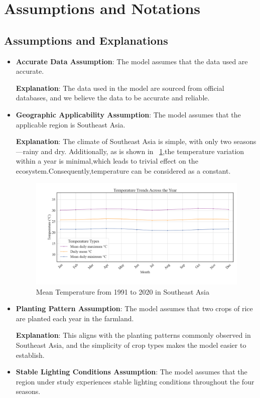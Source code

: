 \documentclass{HZNUMCM}
\begin{document}
  \section{Assumptions and Notations}
    \subsection{Assumptions and Explanations}
      \begin{itemize}
        \item \textbf{Accurate Data Assumption}: The model assumes that the data used are accurate.

        \textbf{Explanation}: The data used in the model are sourced from official databases, and we believe the data to be accurate and reliable.
        \item \textbf{Geographic Applicability Assumption}: The model assumes that the applicable region is Southeast Asia.

        \textbf{Explanation}: The climate of Southeast Asia is simple, with only two seasons—rainy and dry. Additionally, as is shown in \figurename~\ref{fig:Temperature},the temperature variation within a year is minimal,which leads to trivial effect on the ecosystem.Consequently,temperature can be considered as a constant.
        \begin{figure}[H]
          \centering
          \includegraphics[width=\linewidth]{images/AverTemper.png}
          \caption{Mean Temperature from 1991 to 2020 in Southeast Asia}
          \label{fig:Temperature}
        \end{figure}
        \item \textbf{Planting Pattern Assumption}: The model assumes that two crops of rice are planted each year in the farmland.
  
        \textbf{Explanation}: This aligns with the planting patterns commonly observed in Southeast Asia, and the simplicity of crop types makes the model easier to establish.
        \item \textbf{Stable Lighting Conditions Assumption}: The model assumes that the region under study experiences stable lighting conditions throughout the four seasons.
  

\end{itemize}
\end{document}
